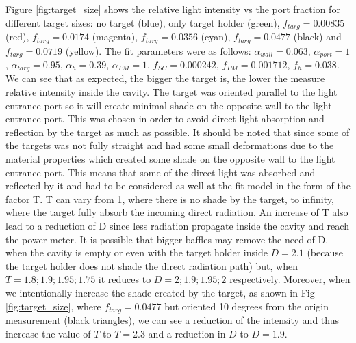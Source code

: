 \documentclass[a4paper]{article}
\begin{document}
Figure \ref{fig:target_size} shows the relative light intensity vs the port fraction for different target sizes: no target (blue), only target holder (green), $f_{targ}=0.00835$ (red), $f_{targ}=0.0174$ (magenta), $f_{targ}=0.0356$ (cyan), $f_{targ}=0.0477$ (black) and $f_{targ}=0.0719$ (yellow). The fit parameters were as follows: $\alpha_{wall}=0.063$, $\alpha_{port}=1$, $\alpha_{targ}=0.95$, $\alpha_{h}=0.39$, $\alpha_{PM}=1$, $f_{SC}=0.000242$,  $f_{PM}=0.001712$, $f_{h}=0.038$. We can see that as expected, the bigger the target is, the lower the measure relative intensity inside the cavity. The target was oriented parallel to the light entrance port so it will create minimal shade on the opposite wall to the light entrance port. This was chosen in order to avoid direct light absorption and reflection by the target as much as possible. It should be noted that since some of the targets was not fully straight and had some small deformations due to the material properties which created some shade on the opposite wall to the light entrance port. This means that some of the direct light was absorbed and reflected by it and had to be considered as well at the fit model in the form of the factor T. T can vary from 1, where there is no shade by the target, to infinity, where the target fully absorb the incoming direct radiation. An increase of T also lead to a reduction of D since less radiation propagate inside the cavity and reach the power meter. It is possible that bigger baffles may remove the need of D. when the cavity is empty or even with the target holder inside $D=2.1$ (because the target holder does not shade the direct radiation path) but, when $T=1.8;1.9;1.95;1.75$ it reduces to $D=2;1.9;1.95;2$ respectively. Moreover, when we intentionally increase the shade created by the target, as shown in Fig \ref{fig:target_size}, where $f_{targ}=0.0477$ but oriented 10 degrees from the origin measurement (black triangles), we can see a reduction of the intensity and thus increase the value of $T$ to $T=2.3$ and a reduction in $D$ to $D=1.9$.
\end{document}
